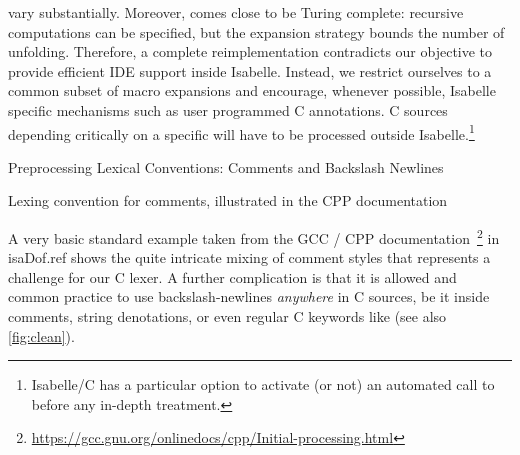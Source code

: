 \begin{isabellebody}
\begin{isamarkuptext}
vary substantially.  Moreover,  comes close to be Turing complete:
recursive computations can be specified, but the expansion strategy bounds the number of
unfolding. Therefore, a complete  reimplementation contradicts our
objective to provide efficient IDE support inside Isabelle. Instead, we restrict ourselves to a
common subset of macro expansions and encourage, whenever possible, Isabelle specific mechanisms
such as user programmed C annotations. C sources depending critically on a specific
 will have to be processed outside
Isabelle.\footnote{Isabelle/C has a particular option to activate (or not) an automated
call to  before any in-depth treatment.}%
\end{isamarkuptext}\isamarkuptrue%
%
\begin{isamarkupsubsection*}%
[label = {lexer_ex},type = {scholarly_paper.technical}, args={label = {lexer_ex},type = {scholarly_paper.technical}, Isa_COL.text_element.level = {}, Isa_COL.text_element.referentiable = {False}, Isa_COL.text_element.variants = {{STR ''outline'', STR ''document''}}, scholarly_paper.text_section.main_author = {}, scholarly_paper.text_section.fixme_list = {}, Isa_COL.text_element.level = {}, scholarly_paper.technical.definition_list = {}}]Preprocessing Lexical Conventions: Comments and Backslash Newlines%
\end{isamarkupsubsection*}\isamarkuptrue%
%
\begin{isamarkupfigure*}%
[label = {C-sample2},type = {Isa_COL.figure}, args={label = {C-sample2},type = {Isa_COL.figure}, Isa_COL.figure.relative_width = {42}, Isa_COL.figure.src = {figures/A-C-Source2}, Isa_COL.figure.spawn_columns = {True}}]Lexing convention for comments, illustrated in the CPP documentation%
\end{isamarkupfigure*}\isamarkuptrue%
%
\begin{isamarkuptext}%
A very basic standard example taken from the GCC / CPP documentation~\footnote{\url{https://gcc.gnu.org/onlinedocs/cpp/Initial-processing.html}}
in \csname isaDof.ref shows the quite intricate mixing of comment styles that
represents a challenge for our C lexer. A further complication is that it is allowed and common
practice to use backslash-newlines \isa{{\isacharbackslash}{\isasymnewline}} \emph{anywhere} in C
sources, be it inside comments, string denotations, or even regular C keywords like
 (see also \autoref{fig:clean}).


\end{isamarkuptext}
\end{isabellebody}
